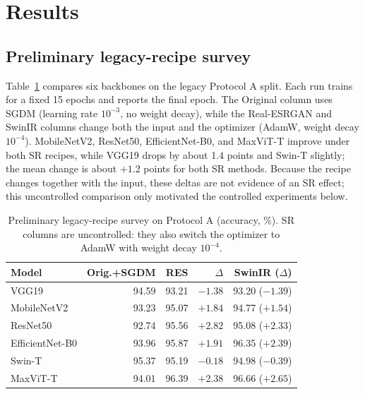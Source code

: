 \documentclass[conference]{IEEEtran}
\begin{document}
\section{Results}\label{sec:results}
\subsection{Preliminary legacy-recipe survey}
Table~\ref{tab:legacy} compares six backbones on the legacy Protocol A split. Each run trains for a fixed 15 epochs and reports the final epoch. The Original column uses SGDM (learning rate $10^{-3}$, no weight decay), while the Real-ESRGAN and SwinIR columns change both the input and the optimizer (AdamW, weight decay $10^{-4}$). MobileNetV2, ResNet50, EfficientNet-B0, and MaxViT-T improve under both SR recipes, while VGG19 drops by about 1.4 points and Swin-T slightly; the mean change is about $+1.2$ points for both SR methods. Because the recipe changes together with the input, these deltas are not evidence of an SR effect; this uncontrolled comparison only motivated the controlled experiments below.

\begin{table}[t]
\centering
\caption{Preliminary legacy-recipe survey on Protocol A (accuracy, \%). SR columns are uncontrolled: they also switch the optimizer to AdamW with weight decay $10^{-4}$.}
\label{tab:legacy}
\small
\begin{tabular}{@{}lrrrr@{}}
\toprule
Model & Orig.+SGDM & RES & $\Delta$ & SwinIR ($\Delta$) \\
\midrule
VGG19            & 94.59 & 93.21 & $-1.38$ & 93.20 ($-1.39$) \\
MobileNetV2      & 93.23 & 95.07 & $+1.84$ & 94.77 ($+1.54$) \\
ResNet50         & 92.74 & 95.56 & $+2.82$ & 95.08 ($+2.33$) \\
EfficientNet-B0  & 93.96 & 95.87 & $+1.91$ & 96.35 ($+2.39$) \\
Swin-T           & 95.37 & 95.19 & $-0.18$ & 94.98 ($-0.39$) \\
MaxViT-T         & 94.01 & 96.39 & $+2.38$ & 96.66 ($+2.65$) \\
\bottomrule
\end{tabular}
\end{table}
\end{document}
